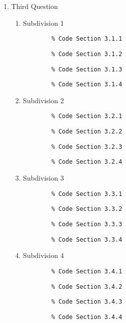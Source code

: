 \documentclass{article}
\begin{document}
\begin{enumerate}
\begin{enumerate}[label*=\arabic*.]
\begin{enumerate}[label*=\arabic*.]
    \item Third Question
    \begin{enumerate}[label*=\arabic*.]
        \item Subdivision 1
        \begin{verbatim}
        % Code Section 3.1.1
        \end{verbatim}
        \begin{verbatim}
        % Code Section 3.1.2
        \end{verbatim}
        \begin{verbatim}
        % Code Section 3.1.3
        \end{verbatim}
        \begin{verbatim}
        % Code Section 3.1.4
        \end{verbatim}

        \item Subdivision 2
        \begin{verbatim}
        % Code Section 3.2.1
        \end{verbatim}
        \begin{verbatim}
        % Code Section 3.2.2
        \end{verbatim}
        \begin{verbatim}
        % Code Section 3.2.3
        \end{verbatim}
        \begin{verbatim}
        % Code Section 3.2.4
        \end{verbatim}

        \item Subdivision 3
        \begin{verbatim}
        % Code Section 3.3.1
        \end{verbatim}
        \begin{verbatim}
        % Code Section 3.3.2
        \end{verbatim}
        \begin{verbatim}
        % Code Section 3.3.3
        \end{verbatim}
        \begin{verbatim}
        % Code Section 3.3.4
        \end{verbatim}

        \item Subdivision 4
        \begin{verbatim}
        % Code Section 3.4.1
        \end{verbatim}
        \begin{verbatim}
        % Code Section 3.4.2
        \end{verbatim}
        \begin{verbatim}
        % Code Section 3.4.3
        \end{verbatim}
        \begin{verbatim}
        % Code Section 3.4.4
        \end{verbatim}


\end{enumerate}
\end{enumerate}
\end{enumerate}
\end{enumerate}
\end{document}
